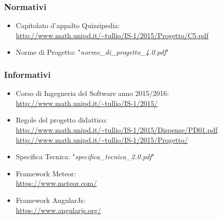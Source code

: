 \documentclass[a4paper,11pt]{article}
\begin{document}
		\subsubsection{Normativi}

		\begin{itemize}
			\item Capitolato d'appalto Quizzipedia:\\
			\url{http://www.math.unipd.it/~tullio/IS-1/2015/Progetto/C5.pdf}
			\item Norme di Progetto: "\textit{norme\_di\_progetto\_4.0.pdf}"
		\end{itemize}
		\subsubsection{Informativi}
		\begin{itemize}
			\item Corso di Ingegneria del Software anno 2015/2016:\\
			\url{http://www.math.unipd.it/~tullio/IS-1/2015/}
			\item Regole del progetto didattico:\\
			\url{http://www.math.unipd.it/~tullio/IS-1/2015/Dispense/PD01.pdf}\\
			\url{http://www.math.unipd.it/~tullio/IS-1/2015/Progetto/}
			\item Specifica Tecnica: "\textit{specifica\_tecnica\_2.0.pdf}"
			\item Framework Meteor:\\
			\url{https://www.meteor.com/}
			\item Framework AngularJs:\\
			\url{https://www.angularjs.org/}
		\end{itemize}
	\pagebreak
	\newpage
	
	\newpage
	
	\newpage
	
	\newpage
	
\end{document}
